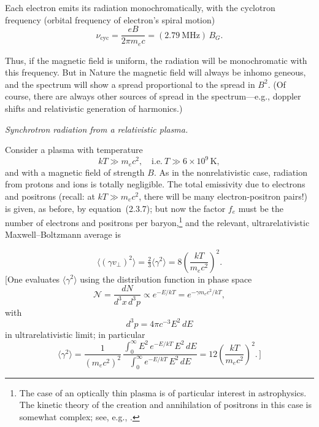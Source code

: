 Each electron emits its radiation monochromatically, with the cyclotron
frequency (orbital frequency of electron's spiral motion)
\begin{equation}
\nu_{\text{cyc}} = \frac{eB}{2\pi m_e c} = (2.79~\text{MHz})\,B_G.
\tag{2.3.10}
\end{equation}

Thus, if the magnetic field is uniform, the radiation will be monochromatic
with this frequency.  But in Nature the magnetic field will always be inhomo\-
geneous, and the spectrum will show a spread proportional to the spread in $B^2$.
(Of course, there are always other sources of spread in the spectrum---e.g., doppler
shifts and relativistic generation of harmonics.)

\medskip
\noindent
\textit{Synchrotron radiation from a relativistic plasma.}

\medskip
\noindent
Consider a plasma with temperature
\begin{equation}
kT \gg m_e c^2, \quad \text{i.e.}\ T \gg 6 \times 10^9\,\text{K},
\tag{2.3.11}
\end{equation}
and with a magnetic field of strength $B$.
As in the nonrelativistic case, radiation
from protons and ions is totally negligible.
The total emissivity due to electrons
and positrons (recall: at $kT \gg m_e c^2$, there will be many electron-positron pairs!)
is given, as before, by equation~(2.3.7); but now the factor $f_e$ must be the number
of electrons and positrons per baryon,\footnote{The case of an optically thin plasma
is of particular interest in astrophysics. The kinetic theory of the creation and
annihilation of positrons in this case is somewhat complex; see, e.g.,
\citet{BisnovatyiKogan1971}.}
and the relevant, ultrarelativistic Maxwell--Boltzmann average is

\begin{equation}
\langle (\gamma v_\perp)^2 \rangle = \tfrac{2}{3}\langle\gamma^2\rangle
= 8\left(\frac{kT}{m_e c^2}\right)^{\!2}.
\tag{2.3.12}
\end{equation}
[One evaluates $\langle\gamma^2\rangle$ using the distribution function in phase space
\begin{equation}
\mathscr{N} = \frac{dN}{d^3 x\,d^3 p} \propto e^{-E/kT} = e^{-\gamma m_e c^2/kT},
\tag*{}
\end{equation}
with
\begin{equation}
d^3 p = 4\pi c^{-3}E^2\,dE
\tag*{}
\end{equation}
in ultrarelativistic limit;
in particular
\begin{equation}
\langle\gamma^2\rangle = \frac{1}{(m_e c^2)^2}\,
\frac{\displaystyle\int_0^\infty E^2\,e^{-E/kT}\,E^2\,dE}
{\displaystyle\int_0^\infty e^{-E/kT}\,E^2\,dE}
= 12\left(\frac{kT}{m_e c^2}\right)^{\!2}.\,]
\tag*{}
\end{equation}

